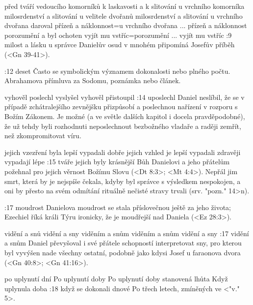     {před tváří vedoucího komorníků k laskavosti a k slitování} %
    {u vrchního komorníka milosrdenství a slitování}  %
    {u velitele dvořanů milosrdenství a slitování} %
    {u vrchního dvořana daroval přízeň a náklonnost}={u vrchního dvořana ... přízeň a náklonnost}  %
    {porozumění a byl ochoten vyjít mu vstříc}={porozumění ... vyjít mu vstříc}  %
:9 {milost a lásku u správce} Danielův osud v mnohém připomíná Josefův příběh (<Gn 39-41>).

:12 {deset} Často se symbolickým významem dokonalosti nebo plného počtu. \dopsat  Abrahamova přímluva za Sodomu, poznámka nebo článek.

    {vyhověl} %
    {poslechl}  %
    {vyslyšel} %
    {vyhověl}  %
    {přistoupil}  %
:14 {uposlechl} Daniel neslíbil, že se v případě zchátralejšího zevnějšku přizpůsobí a poslechnou nařízení v rozporu s Božím Zákonem. Je možné (a ve světle dalších kapitol i docela pravděpodobné), že už tehdy byli rozhodnuti neposlechnout bezbožného vladaře a raději zemřít, než zkompromitovat víru.

    {jejich vzezření byla lepší} %
    {vypadali dobře}  %
    {jejich vzhled je lepší} %
    {vypadali zdravěji}  %
    {vypadají lépe}  %
:15 {tváře jejich byly krásnější} Bůh Danielovi a jeho přátelům požehnal pro jejich věrnost Božímu Slovu (<Dt 8:3>; <Mt 4:4>). Nepřál jim smrt, která by je nejspíše čekala, kdyby byl správce s výsledkem nespokojen, a oni by přesto na svém odmítání rituálně nečisté stravy trvali
(srv. \<"pozn." 14>n). 

:17 {moudrost} Danielova moudrost se stala příslovečnou ještě za jeho života; Ezechiel říká králi Týru ironicky, že je moudřejší nad Daniela (<Ez 28:3>). 

    {vidění a snů} %
    {vidění a sny}  %
    {viděním a snům} %
    {viděním a snům}  %
    {vidění a sny}  %
:17 {vidění a snům} Daniel převyšoval i své přátele schopností interpretovat sny, pro kterou byl vyvýšen nade všechny ostatní, podobně jako kdysi Josef u faraonova dvora (<Gn 40:8>; <Gn 41:16>). 

    {po uplynutí dní} %
    {Po uplynutí doby}  %
    {Po uplynutí doby} %
    {stanovená lhůta}  %
    {Když uplynula doba}  %
:18 {když se dokonali dnové} Po třech letech, zmíněných ve  <"v." 5>.

